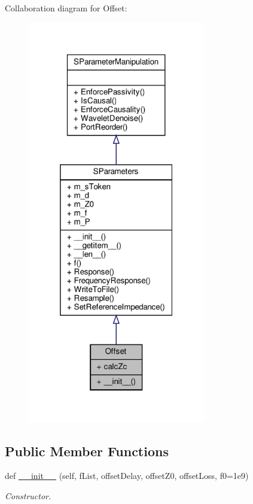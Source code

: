 Collaboration diagram for Offset\+:\nopagebreak
\begin{figure}[H]
\begin{center}
\leavevmode
\includegraphics[width=220pt]{classSignalIntegrity_1_1Measurement_1_1CalKit_1_1Standards_1_1Offset_1_1Offset__coll__graph}
\end{center}
\end{figure}
\subsection*{Public Member Functions}
\begin{DoxyCompactItemize}
\item 
def \hyperlink{classSignalIntegrity_1_1Measurement_1_1CalKit_1_1Standards_1_1Offset_1_1Offset_af11a9605224eedf1e907737dfa12fd37}{\+\_\+\+\_\+init\+\_\+\+\_\+} (self, f\+List, offset\+Delay, offset\+Z0, offset\+Loss, f0=1e9)
\begin{DoxyCompactList}\small\item\em Constructor. \end{DoxyCompactList}\end{DoxyCompactItemize}


